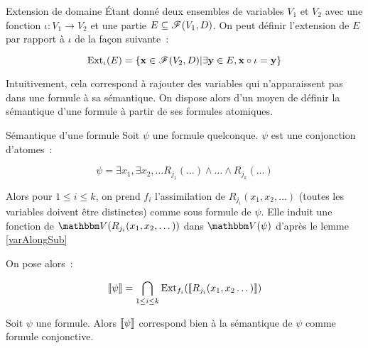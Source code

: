 \begin{defi}{Extension de domaine}
    Étant donné deux ensembles de variables $V_1$ et $V_2$ avec une fonction
    $\iota : V_1 \rightarrow V_2$ et une partie $E\subseteq\mathscr{F}(V_1, D)$. On peut définir
    l'extension de $E$ par rapport à $\iota$ de la façon suivante~:

    \[ \text{Ext}_\iota(E) = \{\mathbf{x}\in\mathscr{F}(V_2,D)
                        | \exists \mathbf{y}\in E, \mathbf{x}\circ\iota = \mathbf{y} \} \]
\end{defi}

Intuitivement, cela correspond à rajouter des variables qui n'apparaissent pas dans une
formule à sa sémantique. On dispose alors d'un moyen de définir la sémantique d'une
formule à partir de ses formules atomiques.

\begin{defi}{Sémantique d'une formule}\label{cspSem}
    Soit $\psi$ une formule quelconque. $\psi$ est une conjonction d'atomes~:

    \[ \psi = \exists x_1,\exists x_2,\dots
                  R_{j_1}(\dots)\wedge\dots\wedge R_{j_k}(\dots) \]

    Alors pour $1\leq i\leq k$, on prend $f_i$ l'assimilation de
    $R_{j_i}(x_1, x_2, \dots)$ (toutes les variables doivent être distinctes) comme
    sous formule de $\psi$. Elle induit une fonction de $\V(R_{j_i}(x_1, x_2, \dots))$
    dans $\V(\psi)$ d'après le lemme \ref{varAlongSub}

    On pose alors~:

    \[ \llbracket {\psi} \rrbracket = \bigcap_{1\leq i\leq k} \text{Ext}_{f_i}(\llbracket {R_{j_i}(x_1, x_2\dots)} \rrbracket) \]
\end{defi}

\begin{lem}
    Soit $\psi$ une formule. Alors $\llbracket {\psi} \rrbracket$ correspond bien à la sémantique de
    $\psi$ comme formule conjonctive.
\end{lem}


